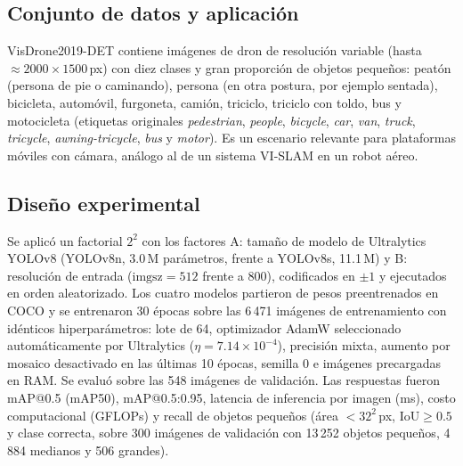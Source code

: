 \documentclass[conference]{IEEEtran}
\begin{document}
\subsection{Conjunto de datos y aplicación}
VisDrone2019-DET \cite{du2018} contiene imágenes de dron de resolución variable (hasta $\approx2000\times1500$\,px) con diez clases y gran proporción de objetos pequeños: peatón (persona de pie o caminando), persona (en otra postura, por ejemplo sentada), bicicleta, automóvil, furgoneta, camión, triciclo, triciclo con toldo, bus y motocicleta (etiquetas originales \emph{pedestrian}, \emph{people}, \emph{bicycle}, \emph{car}, \emph{van}, \emph{truck}, \emph{tricycle}, \emph{awning-tricycle}, \emph{bus} y \emph{motor}). Es un escenario relevante para plataformas móviles con cámara, análogo al de un sistema VI-SLAM en un robot aéreo.

\subsection{Diseño experimental}
Se aplicó un factorial $2^2$ con los factores A: tamaño de modelo de Ultralytics YOLOv8 \cite{jocher2023} (YOLOv8n, 3.0\,M parámetros, frente a YOLOv8s, 11.1\,M) y B: resolución de entrada ($\text{imgsz}=512$ frente a 800), codificados en $\pm1$ y ejecutados en orden aleatorizado. Los cuatro modelos partieron de pesos preentrenados en COCO y se entrenaron 30 épocas sobre las 6\,471 imágenes de entrenamiento con idénticos hiperparámetros: lote de 64, optimizador AdamW seleccionado automáticamente por Ultralytics ($\eta=7.14\times10^{-4}$), precisión mixta, aumento por mosaico desactivado en las últimas 10 épocas, semilla 0 e imágenes precargadas en RAM. Se evaluó sobre las 548 imágenes de validación. Las respuestas fueron mAP@0.5 (mAP50), mAP@0.5:0.95, latencia de inferencia por imagen (ms), costo computacional (GFLOPs) y recall de objetos pequeños (área $<32^2$\,px, IoU$\ge0.5$ y clase correcta, sobre 300 imágenes de validación con 13\,252 objetos pequeños, 4\,884 medianos y 506 grandes).
\end{document}
